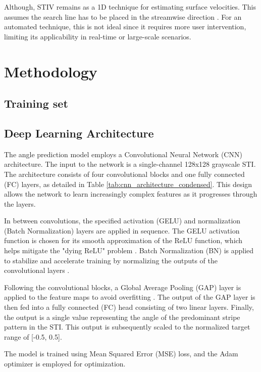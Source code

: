 \documentclass[12pt]{elsarticle}
\begin{document}
Although, STIV remains as a 1D technique for estimating surface velocities. This assumes the search line has to be placed in the streamwise direction \cite{fujita2007development,fujita2019efficient,watanabe2021improving,fujita2020application}. For an automated technique, this is not ideal since it requires more user intervention, limiting its applicability in real-time or large-scale scenarios.

\section{Methodology}
\subsection{Training set}

\subsection{Deep Learning Architecture}
The angle prediction model employs a Convolutional Neural Network (CNN) architecture. The input to the network is a single-channel 128x128 grayscale STI. The architecture consists of four convolutional blocks and one fully connected (FC) layers, as detailed in Table \ref{tab:cnn_architecture_condensed}. This design allows the network to learn increasingly complex features as it progresses through the layers.

In between convolutions, the specified activation (GELU) and normalization (Batch Normalization) layers are applied in sequence. The GELU activation function is chosen for its smooth approximation of the ReLU function, which helps mitigate the "dying ReLU" problem \cite{hendrycks2016GELU, lu2019dying}. Batch Normalization (BN) is applied to stabilize and accelerate training by normalizing the outputs of the convolutional layers \cite{ioffe2015batch}.

Following the convolutional blocks, a Global Average Pooling (GAP) layer is applied to the feature maps to avoid overfitting \cite{watanabe2021improving, lin2013GAP}. The output of the GAP layer is then fed into a fully connected (FC) head consisting of two linear layers. Finally, the output is a single value representing the angle of the predominant stripe pattern in the STI. This output is subsequently scaled to the normalized target range of [-0.5, 0.5].



The model is trained using Mean Squared Error (MSE) loss, and the Adam optimizer is employed for optimization.
\end{document}
